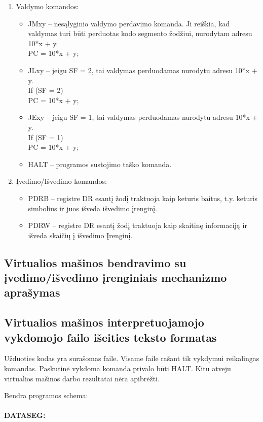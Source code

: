 \begin{description}
\begin{enumerate}
\item Valdymo komandos:
\begin{itemize}
\item JMxy – nesąlyginio valdymo perdavimo komanda. Ji reiškia, kad valdymas turi būti perduotas kodo segmento žodžiui, nurodytam adresu 10*x + y.\leavevmode
\\PC = 10*x + y;
\item JLxy – jeigu SF = 2, tai valdymas perduodamas nurodytu adresu 10*x + y.\leavevmode
\\If (SF = 2)\\ PC = 10*x + y;
\item JExy – jeigu SF = 1, tai valdymas perduodamas nurodytu adresu 10*x + y.\leavevmode
\\If (SF = 1)\\PC = 10*x + y;
\item HALT – programos sustojimo taško komanda.
\end{itemize}
\item Įvedimo/Išvedimo komandos:
\begin{itemize}
\item PDRB – registre DR esantį žodį traktuoja kaip keturis baitus, t.y. keturis simbolius ir juos išveda išvedimo įrenginį.\leavevmode
\item PDRW – registre DR esantį žodį traktuoja kaip skaitinę informaciją ir išveda skaičių į išvedimo Įrenginį.\leavevmode
\end{itemize}
 \end{enumerate}

\end{description}   
   
\subsection{Virtualios mašinos bendravimo su įvedimo/išvedimo įrenginiais
mechanizmo aprašymas}

\subsection{Virtualios mašinos interpretuojamojo vykdomojo failo išeities 
teksto formatas}

Užduoties kodas yra surašomas faile. Visame faile rašant tik vykdymui reikalingas
komandas. Paskutinė vykdoma komanda privalo būti HALT. Kitu atveju virtualios mašinos darbo
rezultatai nėra apibrėžti.

Bendra programos schema:\\
\\\textbf{DATASEG:}

